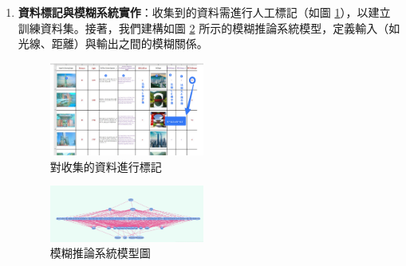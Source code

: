 \documentclass[twocolumn,11pt,a4paper]{article}
\begin{document}
\begin{enumerate}
    \item \textbf{資料標記與模糊系統實作}：收集到的資料需進行人工標記（如圖 \ref{fig:labeling_train_data}），以建立訓練資料集。接著，我們建構如圖 \ref{fig:model} 所示的模糊推論系統模型，定義輸入（如光線、距離）與輸出之間的模糊關係。
    \begin{figure}[htbp]
        \centering
        \includegraphics[width=0.48\textwidth]{res/image/labeling_train_data.png}
        \caption{對收集的資料進行標記}
        \label{fig:labeling_train_data}
    \end{figure}
    \begin{figure}[htbp]
        \centering
        \includegraphics[width=0.48\textwidth]{res/image/model.png}
        \caption{模糊推論系統模型圖}
        \label{fig:model}
    \end{figure}


\end{enumerate}
\end{document}
